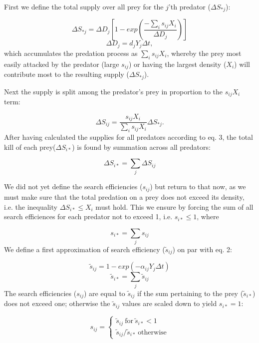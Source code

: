 \documentclass [a4paper, 11pt, openany]  {memoir}
\begin{document}
First we define the total supply over all prey for the $j$'th predator ($\Delta S_{*j}$):

\begin{equation}
\Delta S_{*j} = \Delta D_j \left[1-exp\left(\frac{-\sum_i s_{ij} X_i}{\Delta D_j}\right)\right]
\end{equation}
\[ \Delta D_j = d_jY_j\Delta t ,\]
which accumulates the predation process as $\sum_i s_{ij} X_i$, whereby the prey most easily attacked  by the predator (large $s_{ij}$) or having the largest density ($X_i$) will contribute most to the resulting supply ($\Delta S_{*j}$).

Next the supply is split among the predator's prey in proportion to the $s_{ij} X_i$ term:

\begin{equation}
\Delta S_{ij} = \frac{s_{ij}X_i}{\sum_i s_{ij}X_i} \Delta S_{\ast j}.
\end{equation}
After having calculated the supplies for all predators according to eq. 3, the total kill of each prey($\Delta S_{i*}$) is found by summation across all predators:

\begin{equation}
\Delta S_{i*} = \sum_j \Delta S_{ij}
\end{equation}

We did not yet define the search efficiencies ($s_{ij}$) but return to that now, as we must make sure that the total predation on a prey does not exceed its density, i.e. the inequality $\Delta S_{i*} \leq X_i$ must hold. This we  ensure by forcing the sum of all search efficiences for each predator not to exceed 1, i.e. $s_{i*} \leq 1$, where

\[ s_{i*} = \sum_j s_{ij} \]
We define a first approximation of search efficiency ($\widetilde{s}_{ij}$) on par with eq. 2:

\begin{equation}
\widetilde{s}_{ij} = 1 - exp(-\alpha_{ij} Y_j \Delta t)
\end{equation}
\[ \widetilde{s}_{i*} = \sum_j \widetilde{s}_{ij} \]
The search efficiencies ($s_{ij}$) are equal to $\widetilde{s}_{ij}$ if the sum pertaining to the prey ($\widetilde{s}_{i*}$) does not exceed one; otherwise the $\widetilde{s}_{ij}$ values are scaled down to yield $s_{i*} = 1$:

\begin{equation}
s_{ij}=\begin{cases}
               \widetilde{s}_{ij}\ \text{for}\ \widetilde{s}_{i*} < 1\\
               \widetilde{s}_{ij} / \widetilde{s}_{i*}\ \text{otherwise}
            \end{cases}
\end{equation}
\end{document}
